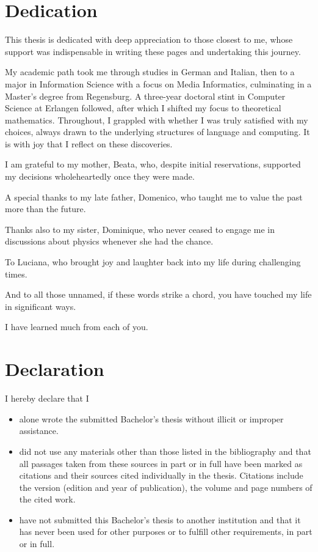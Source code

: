 \documentclass[b5paper, 11pt, twoside]{report}
\begin{document}
\chapter*{Dedication}
This thesis is dedicated with deep appreciation to those closest to me, whose
support was indispensable in writing these pages and undertaking this journey.

My academic path took me through studies in German and Italian, then to a major
in Information Science with a focus on Media Informatics, culminating in a
Master’s degree from Regensburg. A three-year doctoral stint in Computer Science
at Erlangen followed, after which I shifted my focus to theoretical
mathematics. Throughout, I grappled with whether I was truly satisfied with my
choices, always drawn to the underlying structures of language and computing.
It is with joy that I reflect on these discoveries.

I am grateful to my mother, Beata, who, despite initial reservations,
supported my decisions wholeheartedly once they were made.

A special thanks to my late father, Domenico, who taught me to value the past
more than the future.

Thanks also to my sister, Dominique, who never ceased to engage me in
discussions about physics whenever she had the chance.

To Luciana, who brought joy and laughter back into my life during challenging times.

And to all those unnamed, if these words strike a chord, you have touched my life
in significant ways.

I have learned much from each of you.

\chapter*{Declaration}
I hereby declare that I

\begin{itemize}
	\item alone wrote the submitted Bachelor's thesis without illicit or improper
	      assistance.
	      
	\item did not use any materials other than those listed in the bibliography and
	      that all passages taken from these sources in part or in full have been marked
	      as citations and their sources cited individually in the thesis. Citations
	      include the version (edition and year of publication), the volume and page
	      numbers of the cited work.
	      
	\item have not submitted this Bachelor's thesis to another institution and that
	      it has never been used for other purposes or to fulfill other requirements,
	      in part or in full.
\end{itemize}
\end{document}
